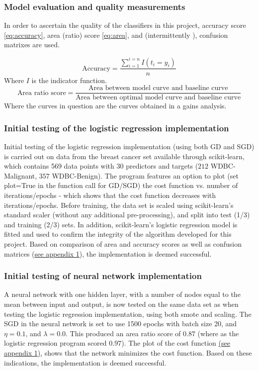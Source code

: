 \documentclass[%
oneside,                 %
final,                   %
10pt]{article}
\begin{document}
\subsubsection{Model evaluation and quality measurements}
In order to ascertain the quality of the classifiers in this project, accuracy score \eqref{eq:accuracy}, area (ratio) score \eqref{eq:area}, and (intermittently ), confusion matrixes are used. 

\begin{equation}
\text{Accuracy}=\frac{\sum_{i=1}^{i=n}I(t_i=y_i)}{n}
\label{eq:accuracy}
\end{equation}
Where $I$ is the indicator function.
\begin{equation}
\text{Area ratio score}=\frac{\text{Area between model curve and baseline curve}}{\text{Area between optimal model curve and baseline curve}}
\label{eq:area}
\end{equation}
Where the curves in question are the curves obtained in a gains analysis. 

\subsubsection{Initial testing of the logistic regression implementation} \label{init_logreg} 
Initial testing of the logistic regression implementation (using both GD and SGD) is carried out on data from the breast cancer set available through scikit-learn, which contains 569 data points with 30 predictors and targets ($212$ WDBC-Malignant, $ 357$ WDBC-Benign). The program features an option to plot (set plot=True in the function call for GD/SGD) the cost function vs. number of iterations/epochs - which shows that the cost function decreases with iterations/epochs. Before training, the data set is scaled using scikit-learn's standard scaler (without any additional pre-processing), and split into test (1/3) and training (2/3) sets. In addition, scikit-learn's logistic regression model is fitted and used to confirm the integrity of the algorithm developed for this project. Based on comparison of area and accuracy scores as well as confusion matrices (\hyperref[APP_1]{see appendix 1}), the implementation is deemed successful.

\subsubsection{Initial testing of neural network implementation} \label{init_NN} 
A neural network with one hidden layer, with a number of nodes equal to the mean between input and output, is now tested on the same data set as when testing the logistic regression implementation, using both smote and scaling. The SGD in the neural network is set to use 1500 epochs with batch size 20, and $\eta=0.1$, and $\lambda=0.0$. This produced an area ratio score of $0.87$ (where as the logistic regression program scored $0.97$). The plot of the cost function \hyperref[APP_1]{(see appendix 1)}, shows that the network minimizes the cost function. Based on these indications, the implementation is deemed successful.
\end{document}

